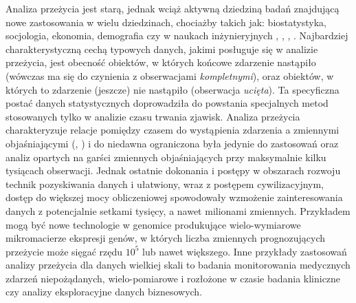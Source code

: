 Analiza przeżycia jest starą, jednak wciąż aktywną dziedziną badań znajdującą nowe zastosowania w wielu dziedzinach, chociażby takich jak: biostatystyka, socjologia, ekonomia, demografia czy w naukach inżynieryjnych \cite{heckman}, \cite{collett}, \cite{boxst}, \cite{hosmer}. Najbardziej charakterystyczną cechą typowych danych, jakimi posługuje się w analizie przeżycia, jest obecność obiektów, w których końcowe zdarzenie nastąpiło (wówczas ma się do czynienia z obserwacjami \textit{kompletnymi}), oraz obiektów, w których to zdarzenie (jeszcze) nie nastąpiło (obserwacja \textit{ucięta}). Ta specyficzna postać danych statystycznych doprowadziła do powstania specjalnych metod stosowanych tylko w analizie czasu trwania zjawisk. Analiza przeżycia charakteryzuje relacje pomiędzy czasem do wystąpienia zdarzenia a zmiennymi objaśniającymi (\cite{kalf}, \cite{oakes}) i do niedawna ograniczona była jedynie do zastosowań oraz analiz opartych na garści zmiennych objaśniających przy maksymalnie kilku tysiącach obserwacji. Jednak ostatnie dokonania i postępy w obszarach rozwoju technik pozyskiwania danych i ułatwiony, wraz z postępem cywilizacyjnym, dostęp do większej mocy obliczeniowej spowodowały wzmożenie zainteresowania danych z potencjalnie setkami tysięcy, a nawet milionami zmiennych. Przykładem mogą być nowe technologie w genomice produkujące wielo-wymiarowe mikromacierze ekspresji genów, w których liczba zmiennych prognozujących przeżycie może sięgać rzędu $10^5$ lub nawet większego. Inne przykłady zastosowań analizy przeżycia dla danych wielkiej skali to badania monitorowania medycznych zdarzeń niepożądanych, wielo-pomiarowe i rozłożone w czasie badania kliniczne czy analizy eksploracyjne danych biznesowych.

